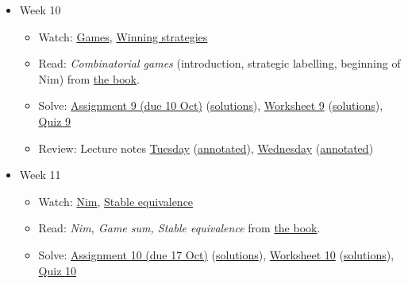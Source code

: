 \documentclass{amsart}
\begin{document}
\begin{itemize}
\begin{itemize}
\end{itemize}
\item Week 10
\begin{itemize}
\item Watch: \href{https://canvas.anu.edu.au/files/857795/}{Games}, \href{https://canvas.anu.edu.au/files/857804/}{Winning strategies}
\item Read: \emph{Combinatorial games} (introduction, strategic labelling, beginning of Nim) from \href{https://canvas.anu.edu.au/files/715877/}{the book}.
\item Solve: \href{https://canvas.anu.edu.au/files/870410/download?download\_frd=1\&verifier=GbVIq9ttu8I6i7tUyfvcuyJvgOsr7i43v3XtT0QR}{Assignment 9 (due 10 Oct)} (\href{https://canvas.anu.edu.au/files/1253166/download?download\_frd=1\&verifier=78p4RQterGdWob2erusOquWO2sYDrGj1w5AZIWEh}{solutions}), \href{https://canvas.anu.edu.au/files/1193018/download?download\_frd=1\&verifier=Fre2KybJXDQwHG7xRSxbI4dhdej5vE1xCFQZEtQU}{Worksheet 9} (\href{https://canvas.anu.edu.au/files/1237040/download?download\_frd=1\&verifier=d5tQtEhqHdUZk1xBLoq5UQDI04e13KJgnvnGKMKS}{solutions}), \href{https://canvas.anu.edu.au/files/1253158/download?download\_frd=1\&verifier=I6LPYJw2WrmoqU9P39jcQQk6cELBQUpKoEI9zv4W}{Quiz 9}
\item Review: Lecture notes \href{https://canvas.anu.edu.au/files/1197681/download?download\_frd=1\&verifier=wPNRjoYWfQ90yzlwCwAGwHePa3WWVbjtqqvL1CKu}{Tuesday} (\href{https://canvas.anu.edu.au/files/1234687/download?download\_frd=1\&verifier=Ks5NPExszg7ncAJf9ewq87x46kH2JqWqoHsg2NiL}{annotated}), \href{https://canvas.anu.edu.au/files/1203429/download?download\_frd=1\&verifier=DW2UglMEQL6sO0Bs4F3eODeNW5fsaLS9Q2Xn1nb0}{Wednesday} (\href{https://canvas.anu.edu.au/files/1234690/download?download\_frd=1\&verifier=HVVj3nsXtPaQCGEVrxp7UMyNGMh86GgpZx6UQ293}{annotated})
\end{itemize}
\item Week 11
\begin{itemize}
\item Watch: \href{https://canvas.anu.edu.au/files/1192864/}{Nim}, \href{https://canvas.anu.edu.au/files/1192874/}{Stable equivalence}
\item Read: \emph{Nim, Game sum, Stable equivalence} from \href{https://canvas.anu.edu.au/files/715877/}{the book}.
\item Solve: \href{https://canvas.anu.edu.au/files/1234680/download?download\_frd=1\&verifier=hKdi5heHolUL8ojRUeeI0KvHddX4Kc022QeE9qns}{Assignment 10 (due 17 Oct)} (\href{https://canvas.anu.edu.au/files/1285505/download?download\_frd=1\&verifier=O9uwD0E7kIpYQ7bsqn4zgetOD72FsvOnTQQJopHT}{solutions}),  \href{https://canvas.anu.edu.au/files/1237035/download?download\_frd=1\&verifier=U7pZ7aIdDkAmqEpAyV1nb0EIK4P9stSaiRVIAhVP}{Worksheet 10} (\href{https://canvas.anu.edu.au/files/1253160/download?download\_frd=1\&verifier=KAEIUuu29GLKGm09hRoWStdoSa88qcGgftvfeZds}{solutions}), \href{https://canvas.anu.edu.au/files/1285498/download?download\_frd=1\&verifier=qdedF6OxMmOunNfrZk2WOHZpeXjqxFKuydcUDEov}{Quiz 10}

\end{itemize}
\end{itemize}
\end{document}

